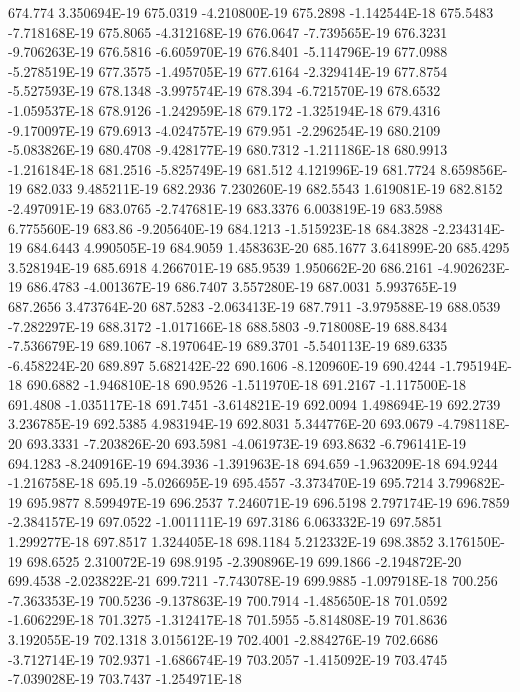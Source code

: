 674.774  3.350694E-19
675.0319  -4.210800E-19
675.2898  -1.142544E-18
675.5483  -7.718168E-19
675.8065  -4.312168E-19
676.0647  -7.739565E-19
676.3231  -9.706263E-19
676.5816  -6.605970E-19
676.8401  -5.114796E-19
677.0988  -5.278519E-19
677.3575  -1.495705E-19
677.6164  -2.329414E-19
677.8754  -5.527593E-19
678.1348  -3.997574E-19
678.394  -6.721570E-19
678.6532  -1.059537E-18
678.9126  -1.242959E-18
679.172  -1.325194E-18
679.4316  -9.170097E-19
679.6913  -4.024757E-19
679.951  -2.296254E-19
680.2109  -5.083826E-19
680.4708  -9.428177E-19
680.7312  -1.211186E-18
680.9913  -1.216184E-18
681.2516  -5.825749E-19
681.512  4.121996E-19
681.7724  8.659856E-19
682.033  9.485211E-19
682.2936  7.230260E-19
682.5543  1.619081E-19
682.8152  -2.497091E-19
683.0765  -2.747681E-19
683.3376  6.003819E-19
683.5988  6.775560E-19
683.86  -9.205640E-19
684.1213  -1.515923E-18
684.3828  -2.234314E-19
684.6443  4.990505E-19
684.9059  1.458363E-20
685.1677  3.641899E-20
685.4295  3.528194E-19
685.6918  4.266701E-19
685.9539  1.950662E-20
686.2161  -4.902623E-19
686.4783  -4.001367E-19
686.7407  3.557280E-19
687.0031  5.993765E-19
687.2656  3.473764E-20
687.5283  -2.063413E-19
687.7911  -3.979588E-19
688.0539  -7.282297E-19
688.3172  -1.017166E-18
688.5803  -9.718008E-19
688.8434  -7.536679E-19
689.1067  -8.197064E-19
689.3701  -5.540113E-19
689.6335  -6.458224E-20
689.897  5.682142E-22
690.1606  -8.120960E-19
690.4244  -1.795194E-18
690.6882  -1.946810E-18
690.9526  -1.511970E-18
691.2167  -1.117500E-18
691.4808  -1.035117E-18
691.7451  -3.614821E-19
692.0094  1.498694E-19
692.2739  3.236785E-19
692.5385  4.983194E-19
692.8031  5.344776E-20
693.0679  -4.798118E-20
693.3331  -7.203826E-20
693.5981  -4.061973E-19
693.8632  -6.796141E-19
694.1283  -8.240916E-19
694.3936  -1.391963E-18
694.659  -1.963209E-18
694.9244  -1.216758E-18
695.19  -5.026695E-19
695.4557  -3.373470E-19
695.7214  3.799682E-19
695.9877  8.599497E-19
696.2537  7.246071E-19
696.5198  2.797174E-19
696.7859  -2.384157E-19
697.0522  -1.001111E-19
697.3186  6.063332E-19
697.5851  1.299277E-18
697.8517  1.324405E-18
698.1184  5.212332E-19
698.3852  3.176150E-19
698.6525  2.310072E-19
698.9195  -2.390896E-19
699.1866  -2.194872E-20
699.4538  -2.023822E-21
699.7211  -7.743078E-19
699.9885  -1.097918E-18
700.256  -7.363353E-19
700.5236  -9.137863E-19
700.7914  -1.485650E-18
701.0592  -1.606229E-18
701.3275  -1.312417E-18
701.5955  -5.814808E-19
701.8636  3.192055E-19
702.1318  3.015612E-19
702.4001  -2.884276E-19
702.6686  -3.712714E-19
702.9371  -1.686674E-19
703.2057  -1.415092E-19
703.4745  -7.039028E-19
703.7437  -1.254971E-18
